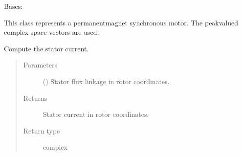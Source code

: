 \documentclass[letterpaper,10pt,english]{sphinxmanual}
\begin{document}
\begin{fulllineitems}
\label{\detokenize{model:model.sm_drive.Motor}}
\pysigstartsignatures
{}
\pysigstopsignatures
\sphinxAtStartPar
Bases: 

\sphinxAtStartPar
This class represents a permanent\sphinxhyphen{}magnet synchronous motor. The
peak\sphinxhyphen{}valued complex space vectors are used.

\begin{fulllineitems}
\label{\detokenize{model:model.sm_drive.Motor.current}}
\pysigstartsignatures
{}
\pysigstopsignatures
\sphinxAtStartPar
Compute the stator current.
\begin{quote}\begin{description}
\item[{Parameters}] \leavevmode
\sphinxAtStartPar
{} () \textendash{} Stator flux linkage in rotor coordinates.

\item[{Returns}] \leavevmode
\sphinxAtStartPar
{} \textendash{} Stator current in rotor coordinates.

\item[{Return type}] \leavevmode
\sphinxAtStartPar
complex

\end{description}\end{quote}

\end{fulllineitems}



\end{fulllineitems}
\end{document}
